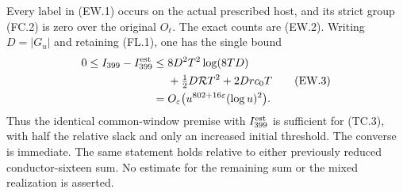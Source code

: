 \begin{corollary}
\label{AC-G146}
Every label in (EW.1) occurs on the actual prescribed host, and
its strict group (FC.2) is zero over the original $O_\ell$.
The exact counts are (EW.2).
Writing $D=|G_u|$ and retaining (FL.1), one has the single bound
\[
 \begin{split}
 0\leq I_{399}-I_{399}^{\rm est}
 \leq{}&8D^2T^2\log(8TD)\\
 &+\tfrac12D\mathcal R T^2+2Dr c_0T\\
 ={}&O_\varepsilon\bigl(u^{802+16\varepsilon}(\log u)^2\bigr).
 \end{split}
 \tag{EW.3}
\]
Thus the identical common-window premise with $I_{399}^{\rm est}$
is sufficient for (TC.3), with half the relative slack and only an
increased initial threshold.  The converse is immediate.
The same statement holds relative to either previously reduced
conductor-sixteen sum.
No estimate for the remaining sum or the mixed realization is asserted.
\end{corollary}

